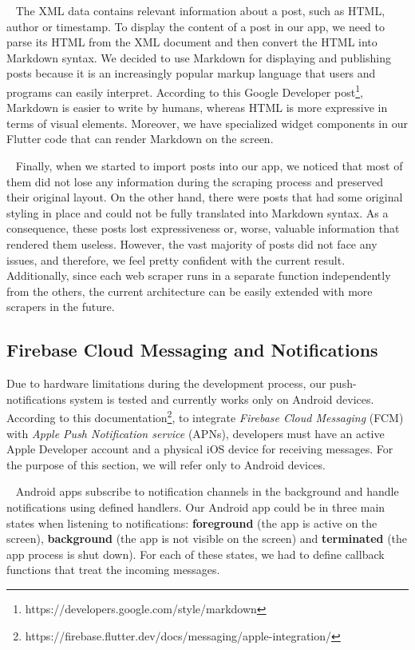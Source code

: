~
The XML data contains relevant information about a post, such as HTML, author or timestamp. To display the content of a post in our app, we need to parse its HTML from the XML document and then convert the HTML into Markdown syntax. We decided to use Markdown for displaying and publishing posts because it is an increasingly popular markup language that users and programs can easily interpret. According to this Google Developer post\footnote{https://developers.google.com/style/markdown}, Markdown is easier to write by humans, whereas HTML is more expressive in terms of visual elements. Moreover, we have specialized widget components in our Flutter code that can render Markdown on the screen.

~
Finally, when we started to import posts into our app, we noticed that most of them did not lose any information during the scraping process and preserved their original layout. On the other hand, there were posts that had some original styling in place and could not be fully translated into Markdown syntax. As a consequence, these posts lost expressiveness or, worse, valuable information that rendered them useless. However, the vast majority of posts did not face any issues, and therefore, we feel pretty confident with the current result. Additionally, since each web scraper runs in a separate function independently from the others, the current architecture can be easily extended with more scrapers in the future. 


\subsection{Firebase Cloud Messaging and Notifications} \label{5:notifications}

Due to hardware limitations during the development process, our push-notifications system is tested and currently works only on Android devices. According to this documentation\footnote{https://firebase.flutter.dev/docs/messaging/apple-integration/}, to integrate \textit{Firebase Cloud Messaging} (FCM) with \textit{Apple Push Notification service} (APNs), developers must have an active Apple Developer account and a physical iOS device for receiving messages. For the purpose of this section, we will refer only to Android devices.

~
Android apps subscribe to notification channels in the background and handle notifications using defined handlers. Our Android app could be in three main states when listening to notifications: \textbf{foreground} (the app is active on the screen), \textbf{background} (the app is not visible on the screen) and \textbf{terminated} (the app process is shut down). For each of these states, we had to define callback functions that treat the incoming messages.

